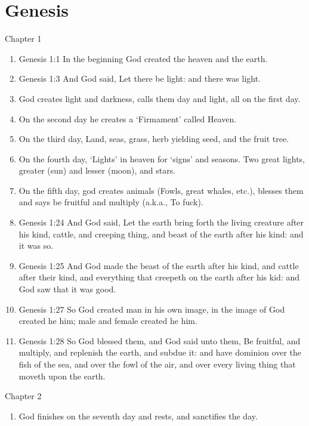\documentclass[crop=false,class=book]{standalone}
\begin{document}
    \section{Genesis}
    Chapter 1
    \begin{enumerate}
        \item Genesis 1:1 In the beginning God created the heaven and the earth.
        \item Genesis 1:3 And God said, Let there be light: and there was light.
        \item God creates light and darkness, calls them day and light, all on the first day.
        \item On the second day he creates a `Firmament' called Heaven.
        \item On the third day, Land, seas, grass, herb yielding seed, and the fruit tree.
        \item On the fourth day, `Lights' in heaven for `signs' and seasons.
              Two great lights, greater (sun) and lesser (moon), and stars.
        \item On the fifth day, god creates animals (Fowls, great whales, etc.), blesses them
              and says be fruitful and multiply (a.k.a., To fuck).
        \item Genesis 1:24 And God said, Let the earth bring forth the living creature after
              his kind, cattle, and creeping thing, and beast of the earth
              after his kind: and it was so.
        \item Genesis 1:25 And God made the beast of the earth after his kind,
              and cattle after their kind, and everything that creepeth on the
              earth after his kid: and God saw that it was good.
        \item Genesis 1:27 So God created man in his own image, in the image of
              God created he him; male and female created he him.
        \item Genesis 1:28 So God blessed them, and God said unto them, Be fruitful,
              and multiply, and replenish the earth, and subdue it: and have dominion
              over the fish of the sea, and over the fowl of the air, and over every
              living thing that moveth upon the earth.
    \end{enumerate}
    Chapter 2
    \begin{enumerate}
        \item God finishes on the seventh day and rests,
              and sanctifies the day.
    \end{enumerate}
\end{document}
